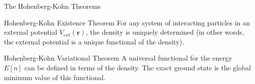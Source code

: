 \documentclass[aspectratio=169]{beamer}
\let \vec \mathbf
\begin{document}
    \begin{frame}{The Hohenberg-Kohn Theorems}
        \begin{alertblock}{Hohenberg-Kohn Existence Theorem}
            For any system of interacting particles in an external potential $V_{ext}(\vec{r})$, the density is uniquely determined (in other words, the external potential is a unique functional of the density).
        \end{alertblock}

        \begin{alertblock}{Hohenberg-Kohn Variational Theorem}
            A universal functional for the energy $E[n]$ can be defined in terms of the density. The exact ground state is the global minimum value of this functional.
        \end{alertblock}

    \end{frame}
\end{document}
